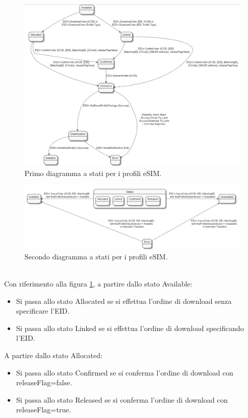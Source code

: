 \documentclass[10pt, twoside, openany]{book}
\begin{document}
\begin{figure}
\includegraphics[width=\linewidth]{profile-states1}
\caption{Primo diagramma a stati per i profili eSIM.}
\label{fig:profile-states1}
\end{figure}
\begin{figure}
\includegraphics[width=\linewidth]{profile-states2}
\caption{Secondo diagramma a stati per i profili eSIM.}
\label{fig:profile-states2}
\end{figure}
\\Con riferimento alla figura \ref{fig:profile-states1}, a partire dallo stato Available:
\begin{itemize}
\item Si passa allo stato Allocated se si effettua l'ordine di download senza specificare l'EID.
\item Si passa allo stato Linked se si effettua l'ordine di download specificando l'EID.
\end{itemize}
A partire dallo stato Allocated:
\begin{itemize}
\item Si passa allo stato Confirmed se si conferma l'ordine di download con releaseFlag=false.
\item Si passa allo stato Released se si conferma l'ordine di download con releaseFlag=true.
\end{itemize}
\end{document}
